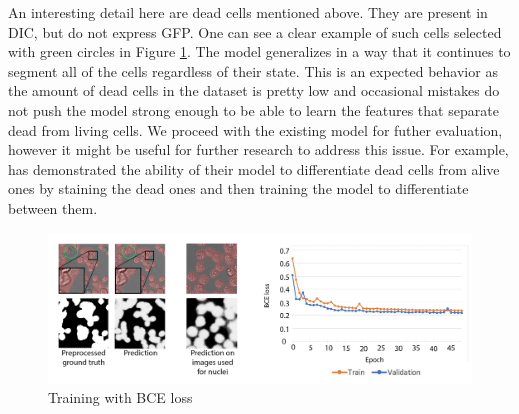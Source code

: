 An interesting detail here are dead cells mentioned above. They are present in DIC, but do not express GFP. One can see a clear example of such cells selected with green circles in Figure \ref{fig:gfp-bce-predictions}. The model generalizes in a way that it continues to segment all of the cells regardless of their state. This is an expected behavior as the amount of dead cells in the dataset is pretty low and occasional mistakes do not push the model strong enough to be able to learn the features that separate dead from living cells. We proceed with the existing model for futher evaluation, however it might be useful for further research to address this issue. For example, \cite{Christiansen_2018} has demonstrated the ability of their model to differentiate dead cells from alive ones by staining the dead ones and then training the model to differentiate between them. 

\begin{figure}[H]
	\begin{center}
		\includegraphics[width=0.8\linewidth]{bilder/gfp/binary-bce/enlarged.png}
		\caption{Training with BCE loss}\label{fig:gfp-bce-predictions}
	\end{center}
\end{figure}
